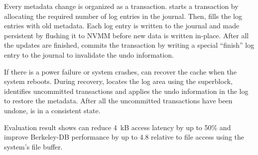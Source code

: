Every metadata change is organized as a transaction.  \Drv{} starts
a transaction by allocating the required number of log entries in the journal.
Then, \drv{} fills the log entries with old metadata.
Each log entry is written to the journal and made persistent by flushing it
to NVMM before new data is written in-place.
After all the updates are finished, \drv{} commits the transaction
by writing a special ``finish'' log entry to the journal to invalidate the undo information.

If there is a power failure or system crashes, \drv{} can recover the cache
when the system reboots.  During recovery, \drv{} locates the log area using
the superblock,
identifies uncommitted transactions and applies the undo information in the log
to restore the metadata.
After all the uncommitted transactions have been undone, \CChell{} is in a
consistent state.

Evaluation result shows \CChell{} can
reduce 4~kB access latency by up to 50\% and improve Berkeley-DB performance
by up to 4.8\x{} relative to file access using the system's file buffer.
